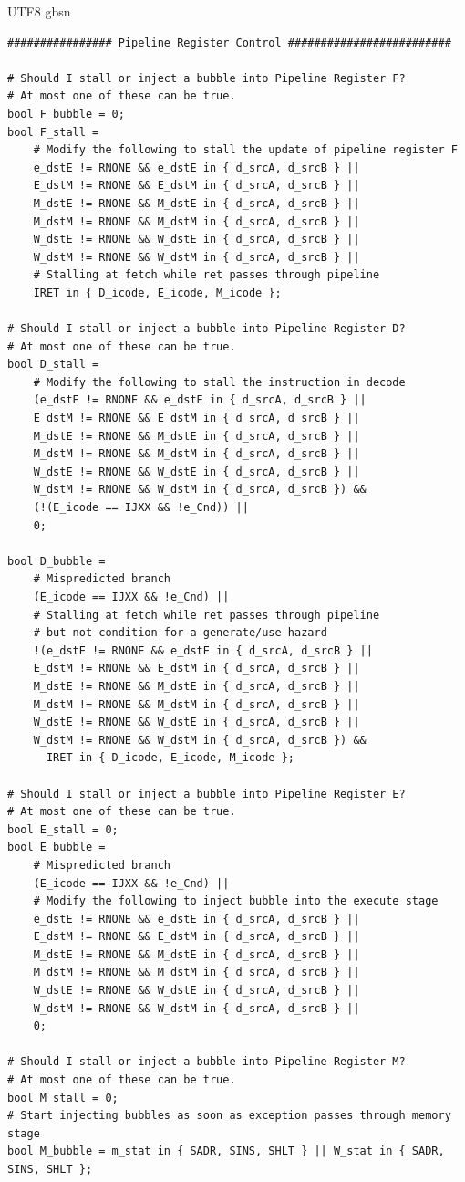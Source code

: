 \documentclass {article}
\begin{document}
\begin {CJK*} {UTF8} {gbsn}
\begin{lstlisting}
################ Pipeline Register Control #########################

# Should I stall or inject a bubble into Pipeline Register F?
# At most one of these can be true.
bool F_bubble = 0;
bool F_stall =
	# Modify the following to stall the update of pipeline register F
	e_dstE != RNONE && e_dstE in { d_srcA, d_srcB } ||
	E_dstM != RNONE && E_dstM in { d_srcA, d_srcB } ||
	M_dstE != RNONE && M_dstE in { d_srcA, d_srcB } ||
	M_dstM != RNONE && M_dstM in { d_srcA, d_srcB } ||
	W_dstE != RNONE && W_dstE in { d_srcA, d_srcB } ||
	W_dstM != RNONE && W_dstM in { d_srcA, d_srcB } ||
	# Stalling at fetch while ret passes through pipeline
	IRET in { D_icode, E_icode, M_icode };

# Should I stall or inject a bubble into Pipeline Register D?
# At most one of these can be true.
bool D_stall = 
	# Modify the following to stall the instruction in decode
	(e_dstE != RNONE && e_dstE in { d_srcA, d_srcB } ||
	E_dstM != RNONE && E_dstM in { d_srcA, d_srcB } ||
	M_dstE != RNONE && M_dstE in { d_srcA, d_srcB } ||
	M_dstM != RNONE && M_dstM in { d_srcA, d_srcB } ||
	W_dstE != RNONE && W_dstE in { d_srcA, d_srcB } ||
	W_dstM != RNONE && W_dstM in { d_srcA, d_srcB }) &&
	(!(E_icode == IJXX && !e_Cnd)) ||
	0;

bool D_bubble =
	# Mispredicted branch
	(E_icode == IJXX && !e_Cnd) ||
	# Stalling at fetch while ret passes through pipeline
	# but not condition for a generate/use hazard
	!(e_dstE != RNONE && e_dstE in { d_srcA, d_srcB } ||
	E_dstM != RNONE && E_dstM in { d_srcA, d_srcB } ||
	M_dstE != RNONE && M_dstE in { d_srcA, d_srcB } ||
	M_dstM != RNONE && M_dstM in { d_srcA, d_srcB } ||
	W_dstE != RNONE && W_dstE in { d_srcA, d_srcB } ||
	W_dstM != RNONE && W_dstM in { d_srcA, d_srcB }) &&
	  IRET in { D_icode, E_icode, M_icode };

# Should I stall or inject a bubble into Pipeline Register E?
# At most one of these can be true.
bool E_stall = 0;
bool E_bubble =
	# Mispredicted branch
	(E_icode == IJXX && !e_Cnd) ||
	# Modify the following to inject bubble into the execute stage
	e_dstE != RNONE && e_dstE in { d_srcA, d_srcB } ||
	E_dstM != RNONE && E_dstM in { d_srcA, d_srcB } ||
	M_dstE != RNONE && M_dstE in { d_srcA, d_srcB } ||
	M_dstM != RNONE && M_dstM in { d_srcA, d_srcB } ||
	W_dstE != RNONE && W_dstE in { d_srcA, d_srcB } ||
	W_dstM != RNONE && W_dstM in { d_srcA, d_srcB } ||
	0;

# Should I stall or inject a bubble into Pipeline Register M?
# At most one of these can be true.
bool M_stall = 0;
# Start injecting bubbles as soon as exception passes through memory stage
bool M_bubble = m_stat in { SADR, SINS, SHLT } || W_stat in { SADR, SINS, SHLT };


\end{lstlisting}
\end{CJK*}
\end{document}
